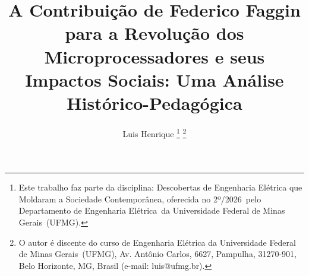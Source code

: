 \usepackage{cite}                        %
\usepackage{url}                         %
\usepackage{microtype}                   %

\usepackage[hidelinks]{hyperref}

\usepackage[nameinlink,noabbrev,brazilian]{cleveref}

\def\universidade{Universidade Federal de Minas Gerais}
\def\siglauni{UFMG}
\def\faculdade{Escola de Engenharia}
\def\departamento{Departamento de Engenharia Elétrica}
\def\disciplina{Descobertas de Engenharia Elétrica que Moldaram a Sociedade Contemporânea}
\def\semestre{2º/2026}
\def\autorartigo{Luis Henrique}
\def\emailautor{luis@ufmg.br}

\title{A Contribuição de Federico Faggin para a Revolução dos Microprocessadores e seus Impactos Sociais: Uma Análise Histórico-Pedagógica}

\author{\autorartigo%
\thanks{Este trabalho faz parte da disciplina: \disciplina, oferecida no \semestre\ pelo \departamento\ da \universidade\ (\siglauni).}%
\thanks{O autor é discente do curso de Engenharia Elétrica da \universidade\ (\siglauni), Av. Antônio Carlos, 6627, Pampulha, 31270-901, Belo Horizonte, MG, Brasil (e-mail: \emailautor).}%
}

